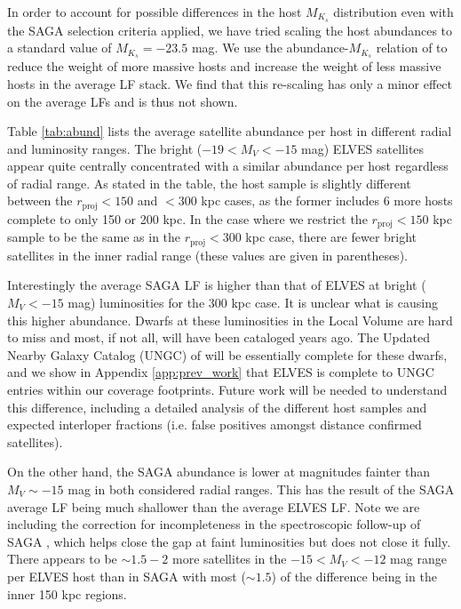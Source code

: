 \documentclass[twocolumn]{aastex62}
\begin{document}
In order to account for possible differences in the host $M_{K_s}$ distribution even with the SAGA selection criteria applied, we have tried scaling the host abundances to a standard value of $M_{K_s}=-23.5$ mag. We use the abundance-$M_{K_s}$ relation of \citet{font2021} to reduce the weight of more massive hosts and increase the weight of less massive hosts in the average LF stack. We find that this re-scaling has only a minor effect on the average LFs and is thus not shown.






Table \ref{tab:abund} lists the average satellite abundance per host in different radial and luminosity ranges. The bright ($-19<M_V<-15$ mag) ELVES satellites appear quite centrally concentrated with a similar abundance per host regardless of radial range. As stated in the table, the host sample is slightly different between the $r_\mathrm{proj}<150$ and $<300$ kpc cases, as the former includes 6 more hosts complete to only 150 or 200 kpc. In the case where we restrict the $r_\mathrm{proj}<150$ kpc sample to be the same as in the $r_\mathrm{proj}<300$ kpc case, there are fewer bright satellites in the inner radial range (these values are given in parentheses). 

Interestingly the average SAGA LF is higher than that of ELVES at bright ($M_V<-15$ mag) luminosities for the 300 kpc case. It is unclear what is causing this higher abundance. Dwarfs at these luminosities in the Local Volume are hard to miss and most, if not all, will have been cataloged years ago. The Updated Nearby Galaxy Catalog (UNGC) of \citet{karachentsev2013} will be essentially complete for these dwarfs, and we show in Appendix \ref{app:prev_work} that ELVES is complete to UNGC entries within our coverage footprints. Future work will be needed to understand this difference, including a detailed analysis of the different host samples and expected interloper fractions (i.e. false positives amongst distance confirmed satellites). %

On the other hand, the SAGA abundance is lower at magnitudes fainter than $M_V\sim-15$ mag in both considered radial ranges. This has the result of the SAGA average LF being much shallower than the average ELVES LF. Note we are including the correction for incompleteness in the spectroscopic follow-up of SAGA \citep[see \S 5.3 of ][]{mao2020}, which helps close the gap at faint luminosities but does not close it fully. There appears to be $\sim1.5-2$ more  satellites in the $-15<M_V<-12$ mag range per ELVES host than in SAGA with most ($\sim1.5$) of the difference being in the inner 150 kpc regions. 
\end{document}
